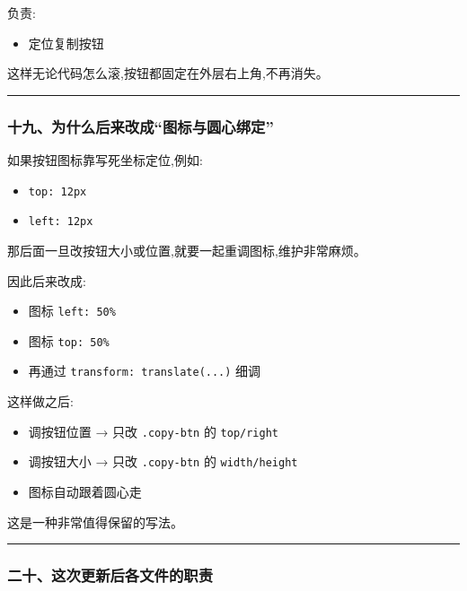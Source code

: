 \documentclass[lang=cn,scheme=chinese,color=blue,device=normal,toc=onecol,math=cm]{elegantbook}
\begin{document}
负责:\par


\begin{itemize}
\item 定位复制按钮
\end{itemize}


这样无论代码怎么滚,按钮都固定在外层右上角,不再消失。\par


\medskip\hrule\medskip


\subsubsection{十九、为什么后来改成“图标与圆心绑定”}


如果按钮图标靠写死坐标定位,例如:\par


\begin{itemize}
\item \texttt{top: 12px}
\item \texttt{left: 12px}
\end{itemize}


那后面一旦改按钮大小或位置,就要一起重调图标,维护非常麻烦。\par


因此后来改成:\par


\begin{itemize}
\item 图标 \texttt{left: 50\%}
\item 图标 \texttt{top: 50\%}
\item 再通过 \texttt{transform: translate(...)} 细调
\end{itemize}


这样做之后:\par


\begin{itemize}
\item 调按钮位置 → 只改 \texttt{.copy-btn} 的 \texttt{top/\allowbreak{}right}
\item 调按钮大小 → 只改 \texttt{.copy-btn} 的 \texttt{width/\allowbreak{}height}
\item 图标自动跟着圆心走
\end{itemize}


这是一种非常值得保留的写法。\par


\medskip\hrule\medskip


\subsubsection{二十、这次更新后各文件的职责}
\end{document}

